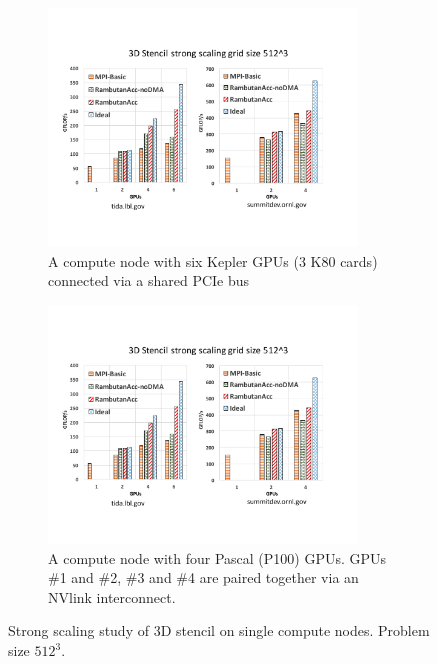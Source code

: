 \begin{figure}[htb]
\begin{subfigure}[b]{0.47\textwidth}
\centering
\includegraphics[width=0.9\textwidth]{figures/stencil_single_node_tida.pdf}
\caption{A compute node with six Kepler GPUs (3 K80 cards) connected via a shared PCIe bus}
\label{stencil_single_node_tida}
\end{subfigure}
\begin{subfigure}[b]{0.47\textwidth}
\centering
\includegraphics[width=0.9\textwidth]{figures/stencil_single_node_summit.pdf}
\caption{A compute node with four Pascal (P100) GPUs. GPUs \#1 and \#2, \#3 and \#4 are paired together via an NVlink interconnect.}
\label{stencil_single_node_summit}
\end{subfigure}
\caption{Strong scaling study of 3D stencil on single compute nodes. Problem size $512^3$.
}
\label{fig:stencil_single_nodes}
\end{figure}

